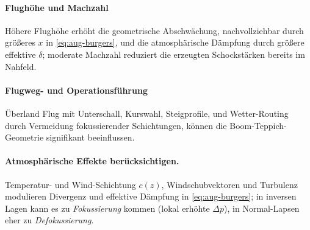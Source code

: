\paragraph{Flughöhe und Machzahl}
Höhere Flughöhe erhöht die geometrische Abschwächung, nachvollziehbar durch
größeres $x$ in \eqref{eq:aug-burgers}, und die atmosphärische Dämpfung durch
größere effektive $\delta$; moderate Machzahl reduziert die erzeugten
Schockstärken bereits im Nahfeld.

\paragraph{Flugweg- und Operationsführung}
Überland Flug mit Unterschall, Kurswahl, Steigprofile, und Wetter-Routing
durch Vermeidung fokussierender Schichtungen, können die
Boom-Teppich-Geometrie signifikant beeinflussen.

\paragraph{Atmosphärische Effekte berücksichtigen.}
Temperatur- und Wind-Schichtung $c(z)$, Windschubvektoren und Turbulenz
modulieren Divergenz und effektive Dämpfung in \eqref{eq:aug-burgers};
in inversen Lagen kann es zu \emph{Fokussierung} kommen (lokal erhöhte
$\Delta p$), in Normal-Lapsen eher zu \emph{Defokussierung}.